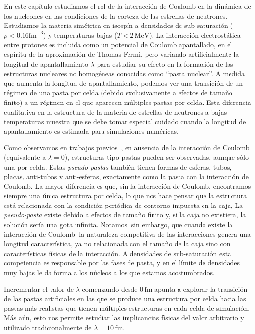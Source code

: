 En este capítulo estudiamos el rol de la interacción de Coulomb en la dinámica de los nucleones en las condiciones de la corteza de las estrellas de neutrones.
Estudiamos la materia simétrica en isospín a densidades de sub-saturación ($\rho < 0.16\text{fm}^{-3}$) y temperaturas bajas ($T < 2\,\text{MeV}$).
La interacción electrostática entre protones es incluida como un potencial de Coulomb apantallado, en el espíritu de la aproximación de Thomas-Fermi, pero variando artificialmente la longitud de apantallamiento $\lambda$ para estudiar su efecto en la formación de las estructuras nucleares no homogéneas conocidas como ``pasta nuclear''.
A medida que aumenta la longitud de apantallamiento, podemos ver una transición de un régimen de una pasta por celda (debido exclusivamente a efectos de tamaño finito) a un régimen en el que aparecen múltiples pastas por celda.
Esta diferencia cualitativa en la estructura de la materia de estrellas de neutrones a bajas temperaturas muestra que se debe tomar especial cuidado cuando la longitud de apantallamiento es estimada para simulaciones numéricas.

Como observamos en trabajos previos~\cite{schneider_nuclear_2013,gimenez_molinelli_simulations_2014}, en ausencia de la interacción de Coulomb (equivalente a $\lambda=0$), estructuras tipo pastas pueden ser observadas, aunque sólo una por celda.
Estas \emph{pseudo-pastas} también tienen formas de esferas, tubos, placas, anti-tubos y anti-esferas, exactamente como la pasta con la interacción de Coulomb.
La mayor diferencia es que, sin la interacción de Coulomb, encontramos siempre una única estructura por celda, lo que nos hace pensar que la estructura está relacionada con la condición periódica de contorno impuesta en la caja,
La \emph{pseudo-pasta} existe debido a efectos de tamaño finito y, si la caja no existiera, la solución sería una gota infinita.
Notamos, sin embargo, que cuando existe la interacción de Coulomb, la naturaleza competitiva de las interacciones genera una longitud característica, ya no relacionada con el tamaño de la caja sino con características físicas de la interacción.
A densidades de sub-saturación esta competencia es responsable por las fases de pasta, y en el límite de densidades muy bajas le da forma a los núcleos a los que estamos acostumbrados.

Incrementar el valor de $\lambda$ comenzando desde $0\,\text{fm}$ apunta a explorar la transición de las pastas artificiales en las que se produce una estructura por celda hacia las pastas más realistas que tienen múltiples estructuras en cada celda de simulación.
Más aún, esto nos permite estudiar las implicancias físicas del valor arbitrario y utilizado tradicionalmente de $\lambda=10\,\text{fm}$.

